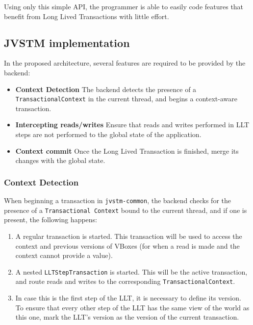 Using only this simple API, the programmer is able to easily code
features that benefit from Long Lived Transactions with little effort.

\subsection{JVSTM implementation}

In the proposed architecture, several features are required to be
provided by the backend:

\begin{itemize}

\item {\bf Context Detection} The backend detects the presence of a
  \texttt{TransactionalContext} in the current thread, and begins a
  context-aware transaction.

\item {\bf Intercepting reads/writes} Ensure that reads and writes
  performed in LLT steps are not performed to the global state of the
  application.

\item {\bf Context commit} Once the Long Lived Transaction is
  finished, merge its changes with the global state.

\end{itemize}

\subsubsection{Context Detection}

When beginning a transaction in \texttt{jvstm-common}, the backend
checks for the presence of a \texttt{Transactional Context} bound to
the current thread, and if one is present, the following happens:

\begin{enumerate}

\item A regular transaction is started. This transaction will be used
  to access the context and previous versions of VBoxes (for when a
  read is made and the context cannot provide a value).

\item A nested \texttt{LLTStepTransaction} is started. This will be the
  active transaction, and route reads and writes to the corresponding
  \texttt{TransactionalContext}.

\item In case this is the first step of the LLT, it is necessary to
  define its version. To ensure that every other step of the LLT has
  the same view of the world as this one, mark the LLT's version as
  the version of the current transaction.

\end{enumerate}

